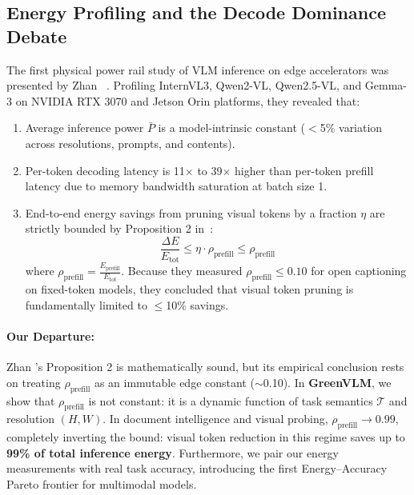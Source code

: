 \subsection{Energy Profiling and the Decode Dominance Debate}
The first physical power rail study of VLM inference on edge accelerators was presented by Zhan \etal~\cite{zhan2026seeing}. Profiling InternVL3, Qwen2-VL, Qwen2.5-VL, and Gemma-3 on NVIDIA RTX 3070 and Jetson Orin platforms, they revealed that:
\begin{enumerate}[leftmargin=*]
    \item Average inference power $\bar{P}$ is a model-intrinsic constant ($<$5\% variation across resolutions, prompts, and contents).
    \item Per-token decoding latency is 11$\times$ to 39$\times$ higher than per-token prefill latency due to memory bandwidth saturation at batch size 1.
    \item End-to-end energy savings from pruning visual tokens by a fraction $\eta$ are strictly bounded by Proposition 2 in~\cite{zhan2026seeing}:
    \begin{equation}
        \frac{\Delta E}{E_{\text{tot}}} \le \eta \cdot \rho_{\text{prefill}} \le \rho_{\text{prefill}}
    \end{equation}
    where $\rho_{\text{prefill}} = \frac{E_{\text{prefill}}}{E_{\text{tot}}}$. Because they measured $\rho_{\text{prefill}} \le 0.10$ for open captioning on fixed-token models, they concluded that visual token pruning is fundamentally limited to $\le$10\% savings.
\end{enumerate}

\paragraph{Our Departure:}
Zhan \etal's Proposition 2 is mathematically sound, but its empirical conclusion rests on treating $\rho_{\text{prefill}}$ as an immutable edge constant ($\sim$0.10). In \textbf{GreenVLM}, we show that $\rho_{\text{prefill}}$ is not constant: it is a dynamic function of task semantics $\mathcal{T}$ and resolution $(H, W)$. In document intelligence and visual probing, $\rho_{\text{prefill}} \to 0.99$, completely inverting the bound: visual token reduction in this regime saves up to \textbf{99\% of total inference energy}. Furthermore, we pair our energy measurements with real task accuracy, introducing the first Energy--Accuracy Pareto frontier for multimodal models.
